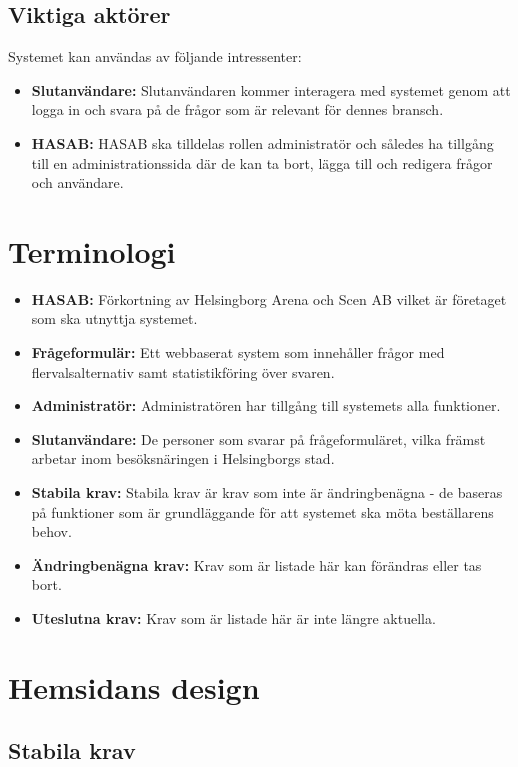 \documentclass{article}
\begin{document}
    \subsection{Viktiga aktörer}
    Systemet kan användas av följande intressenter:
    \begin{itemize}
        \item \textbf{Slutanvändare:} Slutanvändaren kommer interagera med systemet genom att logga in och svara på de frågor som är relevant för dennes bransch.
        \item \textbf{HASAB:} HASAB ska tilldelas rollen administratör och således ha tillgång till en administrationssida där de kan ta bort, lägga till och redigera frågor och användare.
     \end{itemize}
    
    \section{Terminologi}
    \begin{itemize}
        \item \textbf{HASAB:} Förkortning av Helsingborg Arena och Scen AB vilket är företaget som ska utnyttja systemet.
        \item \textbf{Frågeformulär:} Ett webbaserat system som innehåller frågor med flervalsalternativ samt statistikföring över svaren.
        \item \textbf{Administratör:} Administratören har tillgång till systemets alla funktioner.
        \item \textbf{Slutanvändare:}  De personer som svarar på frågeformuläret, vilka främst arbetar inom besöksnäringen i Helsingborgs stad. 
        \item\textbf{Stabila krav:}  Stabila krav är krav som inte är ändringbenägna - de baseras på funktioner som är grundläggande för att systemet ska möta beställarens behov.
        \item \textbf{Ändringbenägna krav:}  Krav som är listade här kan förändras eller tas bort.
        \item \textbf{Uteslutna krav:}  Krav som är listade här är inte längre aktuella.
    \end{itemize}
    
    \section{Hemsidans design}
    
    \subsection*{Stabila krav}
     
\end{document}
